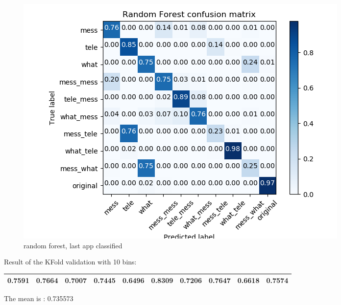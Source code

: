  \begin{figure}[H] 
\centering 
\includegraphics[scale=.6]{images/new_met_rf_initial_single_double_complete.png} 
\caption{random forest, last app classified} 
\end{figure} 


Result of the KFold validation with 10 bins:
 {\def\arraystretch{1.3} 
 \begin{table}[H] 
\centering 
\begin{tabular}{|l |l |l |l |l |l |l |l |l |l |}  
\hline 
0.7591&
0.7664&
0.7007&
0.7445&
0.6496&
0.8309&
0.7206&
0.7647&
0.6618&
0.7574\\ \hline  

\end{tabular} 
\end{table} }

The mean is : 0.735573